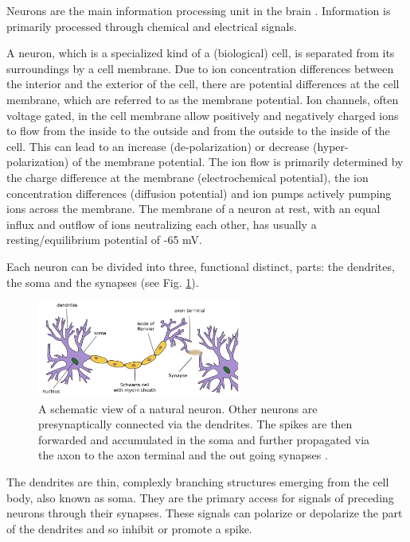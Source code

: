 Neurons are the main information processing unit in the brain \cite{gerstner2014neuronal}\cite{Byrne1997}. 
Information is primarily processed through chemical and electrical signals.

A neuron, which is a specialized kind of a (biological) cell, is separated from its surroundings by a cell membrane.   
Due to ion concentration differences between the interior and the exterior of the cell, there are potential differences at the cell membrane, which are referred to as the membrane potential. 
Ion channels, often voltage gated, in the cell membrane allow positively and negatively charged ions to flow from the inside to the outside and from the outside to the inside of the cell.
This can lead to an increase (de-polarization) or decrease (hyper-polarization) of the membrane potential.
The ion flow is primarily determined by the charge difference at the membrane (electrochemical potential), the ion concentration differences (diffusion potential) and ion pumps actively pumping ions across the membrane.
The membrane of a neuron at rest, with an equal influx and outflow of ions neutralizing each other, has usually a resting/equilibrium potential of -65 mV. 

Each neuron can be divided into three, functional distinct, parts: the dendrites, the soma and the synapses (see Fig. \ref{fig:neuron}).

\begin{figure}[h]
	\centering
    	\includegraphics[width=0.6\textwidth]{imgs/neuron.png} 
    \caption[A schematic view of a natural neuron.]{A schematic view of a natural neuron. Other neurons are presynaptically connected via the dendrites. The spikes are then forwarded and accumulated in the soma and further propagated via the axon to the axon terminal and the out going synapses \cite{neuronImg}.}
	\label{fig:neuron}
\end{figure}

The dendrites are thin, complexly branching structures emerging from the cell body, also known as soma.
They are the primary access for signals of preceding neurons through their synapses. 
These signals can polarize or depolarize the part of the dendrites and so inhibit or promote a spike. 

